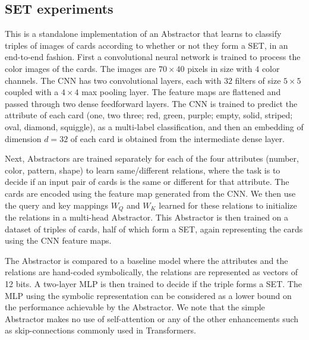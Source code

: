 \subsection{SET experiments}

This is a standalone implementation of an Abstractor that learns to classify triples of images of cards according 
to whether or not they form a SET, in an end-to-end fashion. First a convolutional neural network is trained to process the color images of the cards. The images are $70 \times 40$ pixels in size with $4$ color channels. The CNN has two convolutional layers, each with $32$ filters of size $5\times 5$ coupled with a $4\times 4$ max pooling layer. The feature maps are flattened and passed through two dense feedforward layers. The CNN is trained to predict the attribute of each card (one, two three; red, green, purple; empty, solid, striped; oval, diamond, squiggle), as a multi-label classification, and then an embedding of dimension $d=32$ of each card is obtained from the intermediate dense layer. 

Next, Abstractors are trained separately for each of the four attributes (number, color, pattern, shape) to learn same/different relations, where the task is to decide if an input pair of cards is the same or different for that attribute. The cards are encoded using the feature map generated from the CNN. We then use the query and key mappings $W_Q$ and $W_K$ learned for these relations to initialize the relations in a multi-head Abstractor. This Abstractor is then trained on a dataset of triples of cards, half of which form a SET, again representing the cards using the CNN feature maps.

The Abstractor is compared to a baseline model where the attributes and the relations are hand-coded symbolically, the relations are represented as vectors of 12 bits. A two-layer MLP is then trained to decide if the triple forms a SET. The MLP using the symbolic representation can be considered as a lower bound on the performance achievable by the Abstractor. We note that the simple Abstractor makes no use of self-attention or any of the other enhancements such as skip-connections commonly used in Transformers.
